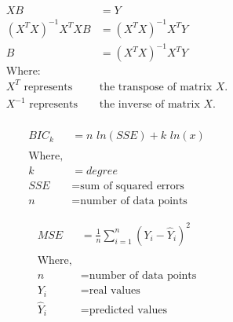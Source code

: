 \documentclass[11pt, a4paper]{article}
\begin{document}
\begin{align*}
    X B                             & = Y                                 \\
    \left(X^T X\right)^{-1} X^T X B & = \left(X^T X\right)^{-1} X^T Y     \\
    B                               & = \left(X^T X\right)^{-1} X^T Y     \\
    \text{Where:}                                                         \\
    X^T    \text{ represents }      & \text{the transpose of matrix } X.  \\
    X^{-1} \text{ represents }      & \text{the inverse of matrix }    X. \\
\end{align*}


\begin{align*}
    BIC_k & = n \,\, ln(SSE) + k \,\, ln(x) \\ \\
    \text{Where,}                           \\
    k     & = degree                        \\
    SSE   & = \text{sum of squared errors}  \\
    n     & = \text{number of data points}
\end{align*}

\begin{align*}
    MSE       & = \frac{1}{n} \sum_{i = 1}^{n} (Y_i - \hat{Y}_i)^2 \\ \\
    \text{Where,}                                                  \\
    n         & = \text{number of data points}                     \\
    Y_i       & = \text{real values}                               \\
    \hat{Y}_i & = \text{predicted values}
\end{align*}
\end{document}
